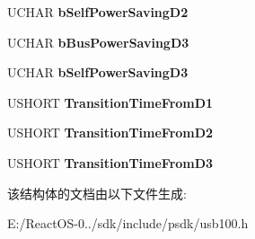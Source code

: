 \begin{DoxyCompactItemize}
U\+C\+H\+AR {\bfseries b\+Self\+Power\+Saving\+D2}
\item 
\mbox{\label{struct___u_s_b___c_o_n_f_i_g_u_r_a_t_i_o_n___p_o_w_e_r___d_e_s_c_r_i_p_t_o_r_aa7a3df04b94c0b430e9c639b7137b9c4}} 
U\+C\+H\+AR {\bfseries b\+Bus\+Power\+Saving\+D3}
\item 
\mbox{\label{struct___u_s_b___c_o_n_f_i_g_u_r_a_t_i_o_n___p_o_w_e_r___d_e_s_c_r_i_p_t_o_r_aa7ca255a42fe3842934105c42fd9722b}} 
U\+C\+H\+AR {\bfseries b\+Self\+Power\+Saving\+D3}
\item 
\mbox{\label{struct___u_s_b___c_o_n_f_i_g_u_r_a_t_i_o_n___p_o_w_e_r___d_e_s_c_r_i_p_t_o_r_adb8a14ad7d864230787414079ae3de92}} 
U\+S\+H\+O\+RT {\bfseries Transition\+Time\+From\+D1}
\item 
\mbox{\label{struct___u_s_b___c_o_n_f_i_g_u_r_a_t_i_o_n___p_o_w_e_r___d_e_s_c_r_i_p_t_o_r_ac3df6f0bff2794db1ec0cd94960c3d2d}} 
U\+S\+H\+O\+RT {\bfseries Transition\+Time\+From\+D2}
\item 
\mbox{\label{struct___u_s_b___c_o_n_f_i_g_u_r_a_t_i_o_n___p_o_w_e_r___d_e_s_c_r_i_p_t_o_r_a597f0aebdd6a427797743a3045e7df7b}} 
U\+S\+H\+O\+RT {\bfseries Transition\+Time\+From\+D3}
\end{DoxyCompactItemize}


该结构体的文档由以下文件生成\+:\begin{DoxyCompactItemize}
\item 
E\+:/\+React\+O\+S-\/0../sdk/include/psdk/usb100.\+h\end{DoxyCompactItemize}
